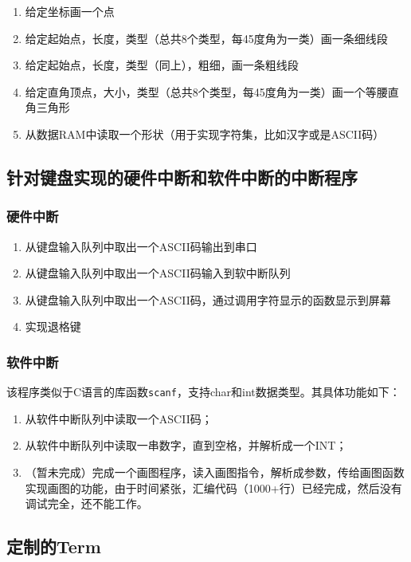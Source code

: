 \begin{enumerate}
    \item 给定坐标画一个点
    \item 给定起始点，长度，类型（总共8个类型，每45度角为一类）画一条细线段
    \item 给定起始点，长度，类型（同上），粗细，画一条粗线段
    \item 给定直角顶点，大小，类型（总共8个类型，每45度角为一类）画一个等腰直角三角形
    \item 从数据RAM中读取一个形状（用于实现字符集，比如汉字或是ASCII码）
\end{enumerate}

\subsection{针对键盘实现的硬件中断和软件中断的中断程序}

\subsubsection{硬件中断}

\begin{enumerate}
    \item 从键盘输入队列中取出一个ASCII码输出到串口
    \item 从键盘输入队列中取出一个ASCII码输入到软中断队列
    \item 从键盘输入队列中取出一个ASCII码，通过调用字符显示的函数显示到屏幕
    \item 实现退格键
\end{enumerate}

\subsubsection{软件中断}

该程序类似于C语言的库函数\texttt{scanf}，支持char和int数据类型。其具体功能如下：

\begin{enumerate}
    \item 从软件中断队列中读取一个ASCII码；
    \item 从软件中断队列中读取一串数字，直到空格，并解析成一个INT；
    \item （暂未完成）完成一个画图程序，读入画图指令，解析成参数，传给画图函数实现画图的功能，由于时间紧张，汇编代码（1000+行）已经完成，然后没有调试完全，还不能工作。
\end{enumerate}

\subsection{定制的Term}

